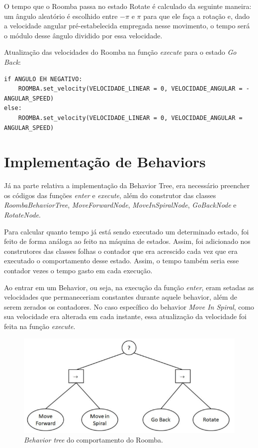 \documentclass[conference]{IEEEtran}
\begin{document}
O tempo que o Roomba passa no estado Rotate é calculado da seguinte maneira: um ângulo aleatório é escolhido entre $-\pi$ e $\pi$ para que ele faça a rotação e, dado a velocidade angular pré-estabelecida empregada nesse movimento, o tempo será o módulo desse ângulo dividido por essa velocidade.

Atualização das velocidades do Roomba na função \textit{execute} para o estado \textit{Go Back}:
\begin{lstlisting}
if ANGULO EH NEGATIVO:
	ROOMBA.set_velocity(VELOCIDADE_LINEAR = 0, VELOCIDADE_ANGULAR = -ANGULAR_SPEED)
else:
	ROOMBA.set_velocity(VELOCIDADE_LINEAR = 0, VELOCIDADE_ANGULAR = ANGULAR_SPEED)
\end{lstlisting}

\section{Implementação de Behaviors}
Já na parte relativa a implementação da Behavior Tree, era necessário preencher os códigos das funções \textit{enter} e \textit{execute}, além do construtor das classes \textit{RoombaBehaviorTree}, \textit{MoveForwardNode}, \textit{MoveInSpiralNode}, \textit{GoBackNode} e \textit{RotateNode}.

Para calcular quanto tempo já está sendo executado um determinado estado, foi feito de forma análoga ao feito na máquina de estados. Assim, foi adicionado nos construtores das classes folhas o contador que era acrescido cada vez que era executado o comportamento desse estado. Assim, o tempo também seria esse contador vezes o tempo gasto em cada execução.

Ao entrar em um Behavior, ou seja, na execução da função \textit{enter}, eram setadas as velocidades que permaneceriam constantes durante aquele behavior, além de serem zerados os contadores. No caso específico do behavior \textit{Move In Spiral}, como sua velocidade era alterada em cada instante, essa atualização da velocidade foi feita na função \textit{execute}.

\begin{figure}[htbp]
\centerline{\includegraphics[scale=0.4]{behavior_tree.png}}
\caption{\textit{Behavior tree} do comportamento do Roomba.}
\label{behavior_tree}
\end{figure}
\end{document}

